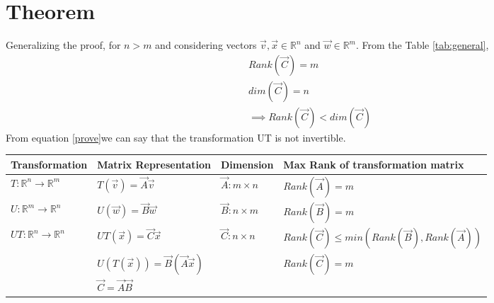 \documentclass[journal,12pt,twocolumn]{IEEEtran}
\numberwithin{table}{section}
\begin{document}
\section{Theorem}
Generalizing the proof, for $n>m$ and considering vectors $\vec{v},\vec{x}\in\mathbb{R}^n$ and $\vec{w}\in\mathbb{R}^m$. From the Table \ref{tab:general}, 
\begin{align}
Rank(\vec{C})=m\\
dim(\vec{C})=n\\
\implies Rank(\vec{C})<dim(\vec{C})\label{prove}
\end{align}
From equation \eqref{prove}we can say that the transformation UT is not invertible. 
\renewcommand{\thetable}{2}
\begin{table*}[h!]
\begin{center}
\begin{tabular}{|l|l|l|l|}
\hline
\textbf{Transformation}&\textbf{Matrix Representation}&\textbf{Dimension}&\textbf{Max Rank  of transformation matrix}\\[0.5ex]
\hline
$T:\mathbb{R}^n\rightarrow\mathbb{R}^m$ & $T(\vec{v})=\vec{A}\vec{v}$ & $\vec{A}:m\times n$ & $Rank(\vec{A})=m$\\[0.5ex]
\hline
$U:\mathbb{R}^m\rightarrow\mathbb{R}^n$ & $U(\vec{w})=\vec{B}\vec{w}$ & $\vec{B}:n\times m$ & $Rank(\vec{B})=m$\\[0.5ex]
\hline
$UT:\mathbb{R}^n\rightarrow\mathbb{R}^n$ & $UT(\vec{x})=\vec{C}\vec{x}$ & $\vec{C}:n\times n$ & $Rank(\vec{C})\le min(Rank(\vec{B}),Rank(\vec{A}))$\\[0.5ex]
&$U(T(\vec{x}))=\vec{B}(\vec{A}\vec{x})$&&$Rank(\vec{C})=m$\\[0.5ex]
&$\vec{C}=\vec{A}\vec{B}$&&\\[0.5ex]
\hline
\end{tabular}
\caption{Generalization of the proof }
\label{tab:general}
\end{center}
\vspace{-0.5cm}
\end{table*}
\end{document}
